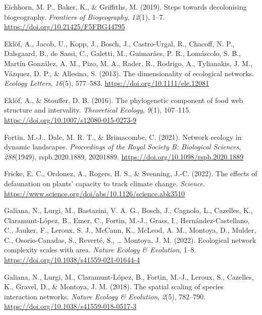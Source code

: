 \documentclass[10pt,oneside]{article}
\newlength{\cslhangindent}
\newenvironment{CSLReferences}[2] %
 {%
  \setlength{\parindent}{0pt}
  \ifodd #1 \everypar{\setlength{\hangindent}{\cslhangindent}}\ignorespaces\fi
  \ifnum #2 > 0
  \setlength{\parskip}{#2\baselineskip}
  \fi
 }%
 {}
\begin{document}
\begin{CSLReferences}{1}{0}
\leavevmode{}%
Eichhorn, M. P., Baker, K., \& Griffiths, M. (2019). Steps towards
decolonising biogeography. \emph{Frontiers of Biogeography},
\emph{12}(1), 1--7. \url{https://doi.org/10.21425/F5FBG44795}

\leavevmode{}%
Eklöf, A., Jacob, U., Kopp, J., Bosch, J., Castro-Urgal, R., Chacoff, N.
P., Dalsgaard, B., de Sassi, C., Galetti, M., Guimarães, P. R.,
Lomáscolo, S. B., Martín González, A. M., Pizo, M. A., Rader, R.,
Rodrigo, A., Tylianakis, J. M., Vázquez, D. P., \& Allesina, S. (2013).
The dimensionality of ecological networks. \emph{Ecology Letters},
\emph{16}(5), 577--583. \url{https://doi.org/10.1111/ele.12081}

\leavevmode{}%
Eklöf, A., \& Stouffer, D. B. (2016). The phylogenetic component of food
web structure and intervality. \emph{Theoretical Ecology}, \emph{9}(1),
107--115. \url{https://doi.org/10.1007/s12080-015-0273-9}

\leavevmode{}%
Fortin, M.-J., Dale, M. R. T., \& Brimacombe, C. (2021). Network ecology
in dynamic landscapes. \emph{Proceedings of the Royal Society B:
Biological Sciences}, \emph{288}(1949), rspb.2020.1889, 20201889.
\url{https://doi.org/10.1098/rspb.2020.1889}

\leavevmode{}%
Fricke, E. C., Ordonez, A., Rogers, H. S., \& Svenning, J.-C. (2022).
The effects of defaunation on plants' capacity to track climate change.
\emph{Science}.
\url{https://www.science.org/doi/abs/10.1126/science.abk3510}

\leavevmode{}%
Galiana, N., Lurgi, M., Bastazini, V. A. G., Bosch, J., Cagnolo, L.,
Cazelles, K., Claramunt-López, B., Emer, C., Fortin, M.-J., Grass, I.,
Hernández-Castellano, C., Jauker, F., Leroux, S. J., McCann, K., McLeod,
A. M., Montoya, D., Mulder, C., Osorio-Canadas, S., Reverté, S.,
\ldots{} Montoya, J. M. (2022). Ecological network complexity scales
with area. \emph{Nature Ecology \& Evolution}, 1--8.
\url{https://doi.org/10.1038/s41559-021-01644-4}

\leavevmode{}%
Galiana, N., Lurgi, M., Claramunt-López, B., Fortin, M.-J., Leroux, S.,
Cazelles, K., Gravel, D., \& Montoya, J. M. (2018). The spatial scaling
of species interaction networks. \emph{Nature Ecology \& Evolution},
\emph{2}(5), 782--790. \url{https://doi.org/10.1038/s41559-018-0517-3}


\end{CSLReferences}
\end{document}
